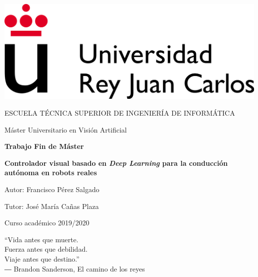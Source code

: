 
\begin{titlepage}
	\begin{center}
	

		\begin{center}
			\includegraphics[width=0.6\linewidth]{img/etsii}
		\end{center}
		\vspace{13mm}
		
		\fontsize{15.5}{14}\selectfont ESCUELA TÉCNICA SUPERIOR DE INGENIERÍA DE INFORMÁTICA
		\vspace{13mm}
		
		\fontsize{14}{14}\selectfont Máster Universitario en Visión Artificial
		
		\vspace{55pt}
		
		\fontsize{15.7}{14}\selectfont \textbf{Trabajo Fin de Máster} 
		
		\vspace{10mm}
		  \begin{huge}
			\textbf{Controlador visual basado en \textit{Deep Learning} para la conducción autónoma en robots reales}
		\end{huge}
		\vspace{20mm}
		
		
		\begin{large}
			Autor: Francisco Pérez Salgado
			
			Tutor: José María Cañas Plaza
			
			\vspace{10mm}
		\end{large}
		\begin{normalsize}
			Curso académico 2019/2020	
		\end{normalsize}
		\vspace{10mm}
		
	\end{center}
	
\end{titlepage}

\newpage
\thispagestyle{empty}
\begin{dedication}
“Vida antes que muerte. \\
Fuerza antes que debilidad. \\
Viaje antes que destino.” \\
\vspace{5mm} %
― Brandon Sanderson, El camino de los reyes
\end{dedication}

